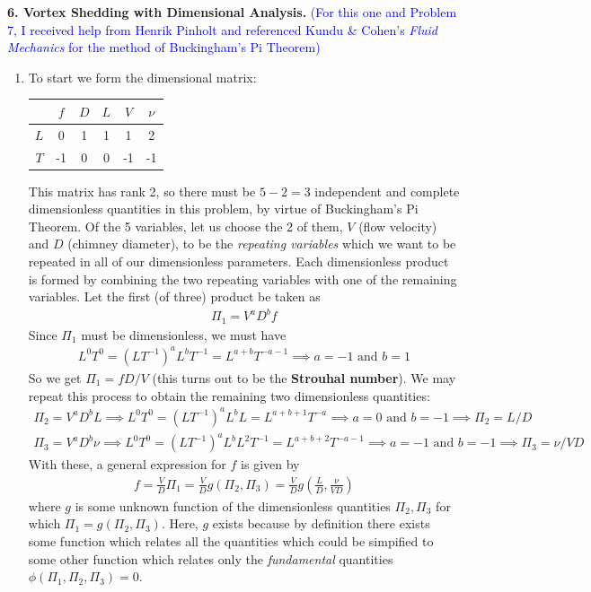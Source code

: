 \documentclass{article}
\theoremstyle{definition}
\newcommand{\f}[2]{\frac{#1}{#2}}
\newcommand{\lp}{\left(}
\newcommand{\rp}{\right)}
\begin{document}
\noindent \textbf{6. Vortex Shedding with Dimensional Analysis.} \textcolor{blue}{(For this one and Problem 7, I received help from Henrik Pinholt and referenced Kundu \& Cohen's \textit{Fluid Mechanics} for the method of Buckingham's Pi Theorem)}

\begin{enumerate}[label=(\alph*)]
	\item To start we form the dimensional matrix:
	\begin{center}
	\begin{tabular}{c|c c c c  c}
		& $f$ & $D$ & $L$ & $V$ & $\nu$ \\
		\hline
		$L$ & 0 & 1 & 1 & 1 & 2\\ 
		$T$ & -1 & 0 & 0 & -1 & -1
	\end{tabular} 
	\end{center}
	This matrix has rank 2, so there must be $5-2 = 3$ independent and complete dimensionless quantities in this problem, by virtue of Buckingham's Pi Theorem. Of the 5 variables, let us choose the 2 of them, $V$ (flow velocity) and $D$ (chimney diameter), to be the \textit{repeating variables} which we want to be repeated in all of our dimensionless parameters. Each dimensionless product is formed by combining the two repeating variables with one of the remaining variables. Let the first (of three) product be taken as
	\begin{align*}
	\Pi_1 = V^a D^b f
	\end{align*}
	Since $\Pi_1$ must be dimensionless, we must have
	\begin{align*}
	L^0 T^0 = (LT^{-1})^{a} L^b T^{-1} = L^{a+b} T^{-a-1} \implies a = -1 \text{ and }  b = 1 
	\end{align*}
	So we get $\boxed{\Pi_1 = f D / V}$ (this turns out to be the \textbf{Strouhal number}). We may repeat this process to obtain the remaining two dimensionless quantities: 
	\begin{align*}
	\Pi_2 = V^a D^b L \implies L^0 T^0 = (LT^{-1})^{a} L^b L = L^{a+b+1} T^{-a} \implies a = 0 \text{ and } b = -1 \implies \boxed{\Pi_2 = L/D} 
	\end{align*}
	\begin{align*}
	\Pi_3 =  V^a D^b \nu  \implies L^0 T^0 = (LT^{-1})^{a} L^b L^2 T^{-1} = L^{a+b+2} T^{-a-1}\implies a = -1 \text{ and } b =  -1 \implies \boxed{\Pi_3 = \nu / VD}
	\end{align*}
	With these, a general expression for $f$ is given by 
	\begin{align*}
	f = \f{V}{D} \Pi_1 = \f{V}{D} g\lp \Pi_2, \Pi_3 \rp = \boxed{\f{V}{D} g\lp \f{L}{D}, \f{\nu}{ VD} \rp }
	\end{align*}
	where $g$ is some unknown function of the dimensionless quantities $\Pi_2, \Pi_3$ for which $\Pi_1 = g(\Pi_2, \Pi_3)$. Here, $g$ exists because by definition there exists some function which relates all the quantities which could be simpified to some other function which relates only the \textit{fundamental} quantities $\phi(\Pi_1,\Pi_2,\Pi_3) = 0$.\\
	

\end{enumerate}
\end{document}
